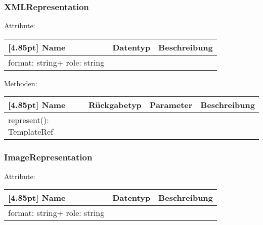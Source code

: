         	\subsubsection{XMLRepresentation}
        	
        	    Attribute:
                \begin{center}
                	\renewcommand{\arraystretch}{1.5}
                    \setlength\tabcolsep{5pt}
                	\begin{tabularx}{\textwidth}{|l|l|X|}
                		\hline
                        \rowcolor[gray]{0.75}[4.85pt]            		
                        Name & Datentyp & Beschreibung \\ \hline
                        format: string+ role: string
                        & &  \\ \hline
                	\end{tabularx}
                \end{center}
                
                Methoden:
        		\begin{center}
                \setlength\tabcolsep{5pt}
                	\renewcommand{\arraystretch}{1.5}
                    	\begin{tabularx}{\textwidth}{|l|l|l|X|}
                    	\hline
                    	\rowcolor[gray]{0.75}[4.85pt]
                		Name & Rückgabetyp & Parameter & Beschreibung \\ \hline
                		represent(): TemplateRef
                        & & &  \\ \hline
                        \end{tabularx}
        		\end{center}
        	
        	\subsubsection{ImageRepresentation}
        	
        	    Attribute:
                \begin{center}
                	\renewcommand{\arraystretch}{1.5}
                    \setlength\tabcolsep{5pt}
                	\begin{tabularx}{\textwidth}{|l|l|X|}
                		\hline
                        \rowcolor[gray]{0.75}[4.85pt]            		
                        Name & Datentyp & Beschreibung \\ \hline
                        format: string+ role: string
                        & &  \\ \hline
                	\end{tabularx}
                \end{center}
                
